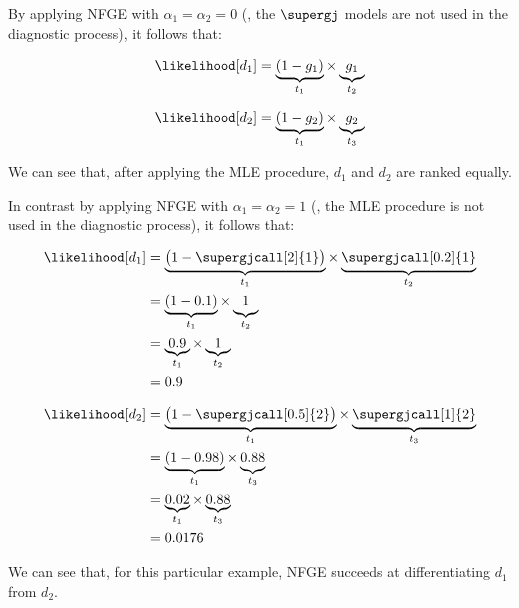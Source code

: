 By applying \ac{NFGE} with $\alpha_1 = \alpha_2 = 0$ (\ie, the
$\supergj$ models are not used in the diagnostic process), it follows
that:
\begin{center}
  \begin{minipage}[t]{0.48\columnwidth}
    \begin{equation}
      \likelihood[d_1] = \underbrace{(1-g_1)}_{t_1} \times \underbrace{\vphantom{(}g_1}_{t_2}
    \end{equation}
  \end{minipage}
  \begin{minipage}[t]{0.48\columnwidth}
    \begin{equation}
      \likelihood[d_2] = \underbrace{(1-g_2)}_{t_1} \times \underbrace{\vphantom{(}g_2}_{t_3}
    \end{equation}
  \end{minipage}
\end{center}
\noindent
We can see that, after applying the \ac{MLE} procedure, $d_1$ and
$d_2$ are ranked equally.

In contrast by applying \ac{NFGE} with $\alpha_1 = \alpha_2 = 1$ (\ie, the
\ac{MLE} procedure is not used in the diagnostic process), it follows
that:

\begin{center}
  \begin{minipage}[t]{0.48\columnwidth}
    \begin{equation}
      \begin{split}
        \likelihood[d_1] &= \underbrace{\big(1-\supergjcall[2]{1}\big)}_{t_1} \times \underbrace{\vphantom{\big(}\supergjcall[0.2]{1}}_{t_2} \\
        &= \underbrace{(1-0.1)}_{t_1} \times \underbrace{\vphantom{(}1}_{t_2} \\
        &= \underbrace{0.9}_{t_1} \times \underbrace{1}_{t_2} \\
        &= 0.9
      \end{split}
    \end{equation}
  \end{minipage}
  \begin{minipage}[t]{0.48\columnwidth}
    \begin{equation}
      \begin{split}
        \likelihood[d_2] &= \underbrace{\big(1-\supergjcall[0.5]{2}\big)}_{t_1} \times \underbrace{\vphantom{\big(}\supergjcall[1]{2}}_{t_3} \\
        &= \underbrace{(1-0.98)}_{t_1} \times \underbrace{\vphantom{(}0.88}_{t_3} \\
        &= \underbrace{0.02}_{t_1} \times \underbrace{0.88}_{t_3} \\
        &= 0.0176
      \end{split}
    \end{equation}
  \end{minipage}
\end{center}
\noindent
We can see that, for this particular example, \ac{NFGE} succeeds at
differentiating $d_1$ from $d_2$.



